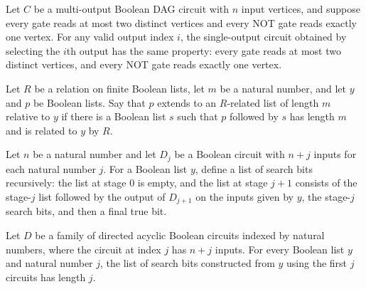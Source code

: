 \begin{theorem}
\label{BoolCircuit.MultiDAGCircuit.outputCircuit_isFaninTwo}
\leanok
{}
Let $C$ be a multi-output Boolean DAG circuit with $n$ input vertices, and suppose every
gate reads at most two distinct vertices and every NOT gate reads exactly one vertex.
For any valid output index $i$, the single-output circuit obtained by selecting the
$i$th output has the same property: every gate reads at most two distinct vertices, and
every NOT gate reads exactly one vertex.
\end{theorem}

\begin{definition}
\label{BoolCircuit.Extends}
\leanok
Let $R$ be a relation on finite Boolean lists, let $m$ be a natural number, and let $y$
and $p$ be Boolean lists. Say that $p$ extends to an $R$-related list of length $m$
relative to $y$ if there is a Boolean list $s$ such that $p$ followed by $s$ has length
$m$ and is related to $y$ by $R$.
\end{definition}

\begin{definition}
\label{BoolCircuit.searchBits}
\leanok
{}
Let $n$ be a natural number and let $D_j$ be a Boolean circuit with $n+j$ inputs for
each natural number $j$. For a Boolean list $y$, define a list of search bits
recursively: the list at stage $0$ is empty, and the list at stage $j+1$ consists of the
stage-$j$ list followed by the output of $D_{j+1}$ on the inputs given by $y$, the
stage-$j$ search bits, and then a final true bit.
\end{definition}

\begin{theorem}
\label{BoolCircuit.length_searchBits}
\leanok
{}
Let $D$ be a family of directed acyclic Boolean circuits indexed by natural numbers,
where the circuit at index $j$ has $n+j$ inputs. For every Boolean list $y$ and natural
number $j$, the list of search bits constructed from $y$ using the first $j$ circuits
has length $j$.
\end{theorem}

